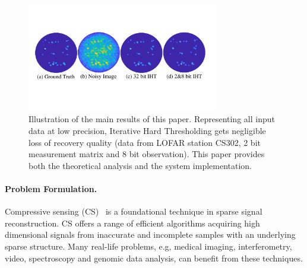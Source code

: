 \documentclass{article}
\begin{document}
\begin{figure}\label{sky_images}
  \centering
    \includegraphics[width=0.75\textwidth]{figs/sky_images_nips.pdf}
  \caption{Illustration of the main results of this paper. Representing all input data at 
  low precision, Iterative Hard Thresholding gets negligible loss of recovery quality (data from LOFAR station CS302, 2 bit measurement matrix and 8 bit observation). This paper provides both  the theoretical analysis and the system implementation.}
  \label{fig:sky_images}
\end{figure}

\paragraph{Problem Formulation.}
Compressive sensing (CS)~\cite{donoho2006cs, candes2006cs, candes2006cs2} is a foundational technique in sparse signal reconstruction. CS offers a range of efficient algorithms acquiring high dimensional signals from inaccurate and incomplete samples with an underlying sparse structure. 
Many real-life problems, e.g, medical imaging, interferometry, video, spectroscopy and genomic data analysis, can benefit from these techniques.
\end{document}
